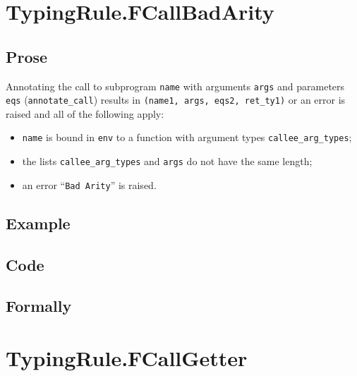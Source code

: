 \documentclass{book}
\begin{document}
\section{TypingRule.FCallBadArity \label{sec:TypingRule.FCallBadArity}}

  \subsection{Prose}
  Annotating the call to subprogram \texttt{name} with arguments \texttt{args}
and parameters \texttt{eqs} (\texttt{annotate\_call}) results in
\texttt{(name1, args, eqs2, ret\_ty1)} or an error is raised and all of the
following apply:
   \begin{itemize}
   \item \texttt{name} is bound in \texttt{env} to a function with argument types \texttt{callee\_arg\_types};
   \item the lists \texttt{callee\_arg\_types} and \texttt{args} do not have the same length;
   \item an error ``\texttt{Bad Arity}'' is raised.
   \end{itemize}

  \subsection{Example}

  \subsection{Code}

\begin{emptyformal}
    \subsection{Formally}
\end{emptyformal}


\section{TypingRule.FCallGetter \label{sec:TypingRule.FCallGetter}}
\end{document}
